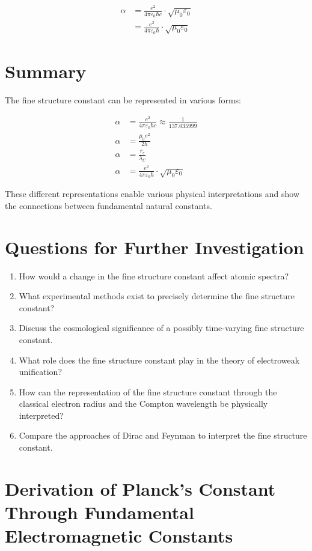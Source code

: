 \documentclass{article}
\begin{document}
	\begin{align}
		\alpha &= \frac{e^2}{4\pi\varepsilon_0\hbar c} \cdot \sqrt{\mu_0\varepsilon_0}\\
		&= \frac{e^2}{4\pi\varepsilon_0\hbar} \cdot \sqrt{\mu_0\varepsilon_0}
	\end{align}
	
	\section{Summary}
	The fine structure constant can be represented in various forms:
	
	\begin{align}
		\alpha &= \frac{e^2}{4\pi\varepsilon_0\hbar c} \approx \frac{1}{137.035999}\\
		\alpha &= \frac{\mu_0e^2}{2h}\\
		\alpha &= \frac{r_e}{\lambda_C}\\
		\alpha &= \frac{e^2}{4\pi\varepsilon_0\hbar} \cdot \sqrt{\mu_0\varepsilon_0}
	\end{align}
	
	These different representations enable various physical interpretations and show the connections between fundamental natural constants.
	
	\section{Questions for Further Investigation}
	
	\begin{enumerate}
		\item How would a change in the fine structure constant affect atomic spectra?
		\item What experimental methods exist to precisely determine the fine structure constant?
		\item Discuss the cosmological significance of a possibly time-varying fine structure constant.
		\item What role does the fine structure constant play in the theory of electroweak unification?
		\item How can the representation of the fine structure constant through the classical electron radius and the Compton wavelength be physically interpreted?
		\item Compare the approaches of Dirac and Feynman to interpret the fine structure constant.
	\end{enumerate}
	
	\section{Derivation of Planck's Constant Through Fundamental Electromagnetic Constants}
	
\end{document}
